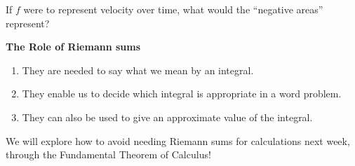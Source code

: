 {If $f$ were to represent velocity over time, what would the ``negative
  areas'' represent?}

\vfill
\newpage


% 

\newpage
\begin{boxnote}
{\bf The Role of Riemann sums}
\begin{enumerate}
\item They are needed to say what we mean by an integral. \\[2ex]
\item They enable us to decide which integral is appropriate in a word
problem. \\[2ex]
\item They can also be used to give an approximate value of the
integral. 
\end{enumerate}
\end{boxnote}

\vspace{0.5in}

We will explore how to avoid needing Riemann sums for calculations next week, through the Fundamental Theorem of Calculus! 



